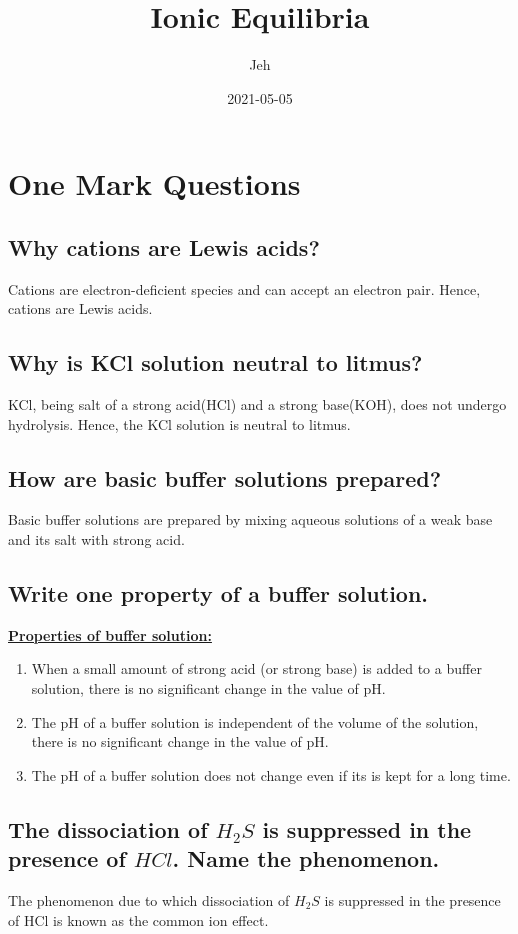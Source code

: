 \documentclass{article}
\title{Ionic Equilibria}
\date{2021-05-05}
\author{Jeh}
\begin{document}
\maketitle
{}
   \section{One Mark Questions}
   \subsection{Why cations are Lewis acids?}
   Cations are electron-deficient species and can accept an electron pair.
   Hence, cations are Lewis acids.

   \subsection{Why is KCl solution neutral to litmus?}
   KCl, being salt of a strong acid(HCl) and a strong base(KOH), does not
   undergo hydrolysis. Hence, the KCl solution is neutral to litmus.

   \subsection{How are basic buffer solutions prepared?}
   Basic buffer solutions are prepared by mixing aqueous solutions of a weak
   base and its salt with strong acid.

   \subsection{Write one property of a buffer solution.}
   \textbf{\underline{Properties of buffer solution:}}
   \begin{enumerate}
	\item When a small amount of strong acid (or strong base) is added
	to a buffer solution, there is no significant change in the value
	of pH.
	\item The pH of a buffer solution is independent of the volume of 
	the solution, there is no significant change in the value of pH.
	\item The pH of a buffer solution does not change even if its is 
	kept for a long time.
   \end{enumerate}

   \subsection{The dissociation of $H_2S$ is suppressed in the presence of 
   $HCl$. Name the phenomenon.}
   The phenomenon due to which dissociation of $H_2S$ is suppressed in the
   presence of HCl is known as the common ion effect.
\end{document}
